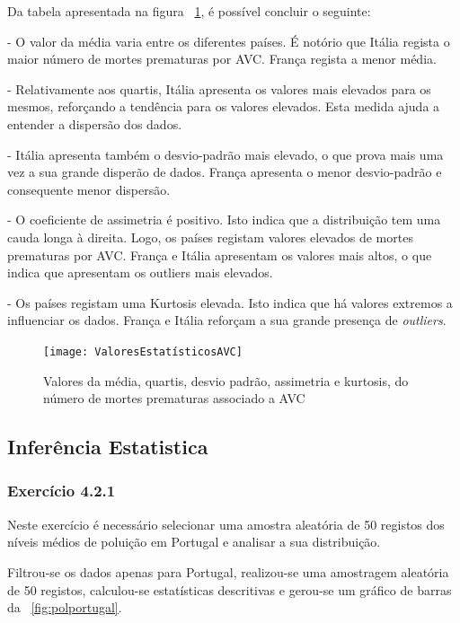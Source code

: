 \documentclass[conference]{IEEEtran}
\begin{document}
Da tabela apresentada na figura \figurename~\ref{fig:valoresestatisticos}, é possível concluir o seguinte:

- O valor da média varia entre os diferentes países. É notório que Itália regista o maior número de mortes prematuras por AVC. França regista a menor média.

- Relativamente aos quartis, Itália apresenta os valores mais elevados para os mesmos, reforçando a tendência para os valores elevados. Esta medida ajuda a entender a dispersão dos dados.

- Itália apresenta também o desvio-padrão mais elevado, o que prova mais uma vez a sua grande disperão de dados. França apresenta o menor desvio-padrão e consequente menor dispersão.

- O coeficiente de assimetria é positivo. Isto indica que a distribuição tem uma cauda longa à direita. Logo, os países registam valores elevados de mortes prematuras por AVC. França e Itália apresentam os valores mais altos, o que indica que apresentam os outliers mais elevados.

- Os países registam uma Kurtosis elevada. Isto indica que há valores extremos a influenciar os dados. França e Itália reforçam a sua grande presença de \textit{outliers}.



\begin{figure}
	\centering
	\texttt{[image: ValoresEstatísticosAVC]}
	\caption{Valores da média, quartis, desvio padrão, assimetria e kurtosis, do número de mortes prematuras associado a AVC}
	\label{fig:valoresestatisticos}
\end{figure}


\subsection{Inferência Estatistica}
\medskip
\subsubsection{\textbf{Exercício 4.2.1}}

Neste exercício é necessário selecionar uma amostra aleatória de 50 registos dos níveis médios de poluição em Portugal e analisar a sua distribuição.

Filtrou-se os dados apenas para Portugal, realizou-se uma amostragem aleatória de 50 registos, calculou-se estatísticas descritivas e gerou-se um gráfico de barras da \figurename~\ref{fig:polportugal}.
\end{document}
